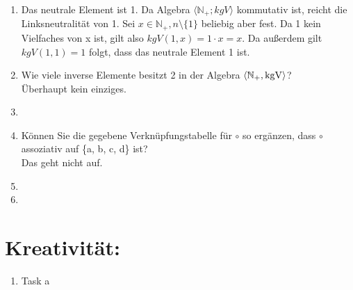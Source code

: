 \begin{enumerate}[label=(\alph*)]
        \item 
        Das neutrale Element ist 1.
        Da Algebra $\langle\mathbb{N}_+; kgV \rangle$ kommutativ ist, reicht die Linksneutralität von 1. Sei $x \in \mathbb{ N}_+, n \setminus \{1\}$ beliebig aber fest.  Da 1 kein Vielfaches von x ist, gilt also $kgV (1, x) = 1 \cdot x =  x$. Da außerdem gilt $kgV (1, 1) = 1$ folgt, dass das neutrale Element 1 ist.
        \item Wie viele inverse Elemente besitzt 2 in der Algebra $\langle \mathbb{N}_+ , \operatorname{kgV} \rangle$?\\
        Überhaupt kein einziges.
        
        \item 
        
        \item Können Sie die gegebene Verknüpfungstabelle für $\circ$ so ergänzen, dass $\circ$ assoziativ 
        auf \{a, b, c, d\} ist?\\
        Das geht nicht auf.
        
        \item
        
        \item         
        
    \end{enumerate}
    \section*{Kreativität:}
    \begin{enumerate}[label=(\alph*)]
    	\item Task a
    \end{enumerate}
